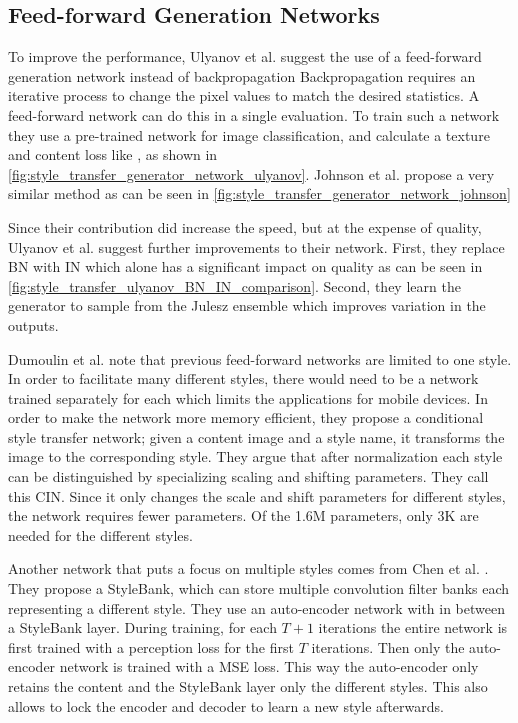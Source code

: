 \subsection{Feed-forward Generation Networks}
To improve the performance, Ulyanov et al. \cite{Ulyanov2016} suggest the use of a feed-forward generation network instead of backpropagation
Backpropagation requires an iterative process to change the pixel values to match the desired statistics.
A feed-forward network can do this in a single evaluation.
To train such a network they use a pre-trained network for image classification, and calculate a texture and content loss like \cite{Gatys2016}, as shown in \ref{fig:style_transfer_generator_network_ulyanov}.
Johnson et al. \cite{Johnson2016} propose a very similar method as can be seen in \ref{fig:style_transfer_generator_network_johnson}

Since their contribution did increase the speed, but at the expense of quality, Ulyanov et al. \cite{Ulyanov2017} suggest further improvements to their network.
First, they replace \gls{BN} \cite{Ioffe2015} with \gls{IN} which alone has a significant impact on quality as can be seen in \ref{fig:style_transfer_ulyanov_BN_IN_comparison}.
Second, they learn the generator to sample from the Julesz ensemble \cite{Zhu2000} which improves variation in the outputs.

Dumoulin et al. \cite{Dumoulin2016} note that previous feed-forward networks are limited to one style.
In order to facilitate many different styles, there would need to be a network trained separately for each which limits the applications for mobile devices.
In order to make the network more memory efficient, they propose a conditional style transfer network; given a content image and a style name, it transforms the image to the corresponding style.
They argue that after normalization each style can be distinguished by specializing scaling and shifting parameters.
They call this \gls{CIN}.
Since it only changes the scale and shift parameters for different styles, the network requires fewer parameters.
Of the 1.6M parameters, only 3K are needed for the different styles.

Another network that puts a focus on multiple styles comes from Chen et al. \cite{Chen2017}.
They propose a StyleBank, which can store multiple convolution filter banks each representing a different style.
They use an auto-encoder network with in between a StyleBank layer.
During training, for each $T+1$ iterations the entire network is first trained with a perception loss for the first $T$ iterations.
Then only the auto-encoder network is trained with a \gls{MSE} loss.
This way the auto-encoder only retains the content and the StyleBank layer only the different styles.
This also allows to lock the encoder and decoder to learn a new style afterwards.

